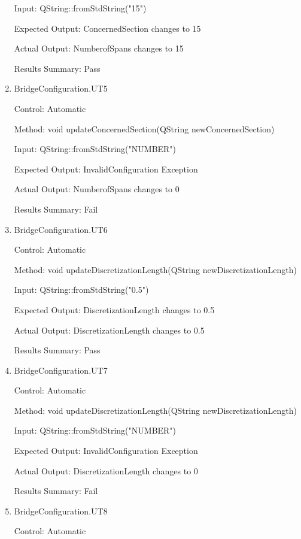 \documentclass[12pt, titlepage]{article}
\begin{document}
\begin{enumerate}
    Input: QString::fromStdString("15")
    
    Expected Output: ConcernedSection changes to 15

    Actual Output: NumberofSpans changes to 15

    Results Summary: Pass

    \item  {BridgeConfiguration.UT5\\}
    
    Control: Automatic
    
    Method:  void updateConcernedSection(QString newConcernedSection)
    
    Input: QString::fromStdString("NUMBER")
    
    Expected Output: InvalidConfiguration Exception

    Actual Output: NumberofSpans changes to 0

    Results Summary: Fail

    \item  {BridgeConfiguration.UT6\\}
    
    Control: Automatic
    
    Method:  void updateDiscretizationLength(QString newDiscretizationLength)
    
    Input: QString::fromStdString("0.5")
    
    Expected Output: DiscretizationLength changes to 0.5

    Actual Output: DiscretizationLength changes to 0.5

    Results Summary: Pass

    \item {BridgeConfiguration.UT7\\}

    Control: Automatic
    
    Method:  void updateDiscretizationLength(QString newDiscretizationLength)
    
    Input: QString::fromStdString("NUMBER")
    
    Expected Output: InvalidConfiguration Exception

    Actual Output: DiscretizationLength changes to 0

    Results Summary: Fail

    \item {BridgeConfiguration.UT8\\}

    Control: Automatic
    

\end{enumerate}
\end{document}
